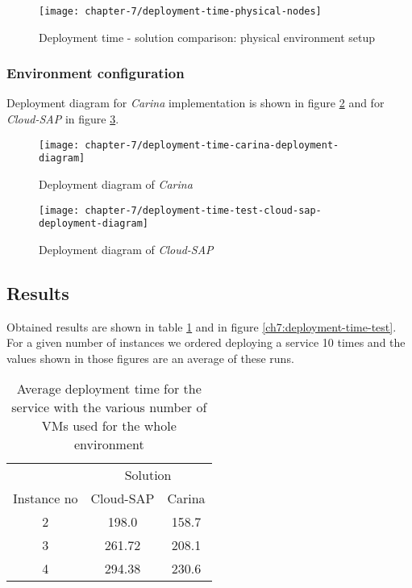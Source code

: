 \begin{figure}[!ht]
  \begin{center}
    \texttt{[image: chapter-7/deployment-time-physical-nodes]}
  \end{center}
  \caption{Deployment time - solution comparison: physical environment setup}
  \label{eval:deployment-time-physical-nodes}
\end{figure}

\subsubsection{Environment configuration}
Deployment diagram for \emph{Carina} implementation is shown in figure \ref{ch7:deployment-time-test-deployment-time-carina-deployment-diagram} and for \emph{Cloud-SAP} in figure \ref{ch7:deployment-time-test-cloud-sap-deployment-diagram}.

\begin{figure}[!ht]
  \begin{center}
    \texttt{[image: chapter-7/deployment-time-carina-deployment-diagram]}
  \end{center}
  \caption{Deployment diagram of \emph{Carina}}
  \label{ch7:deployment-time-test-deployment-time-carina-deployment-diagram}
\end{figure}

\begin{figure}[!ht]
  \begin{center}
    \texttt{[image: chapter-7/deployment-time-test-cloud-sap-deployment-diagram]}
  \end{center}
  \caption{Deployment diagram of \emph{Cloud-SAP}}
  \label{ch7:deployment-time-test-cloud-sap-deployment-diagram}
\end{figure}

\subsection*{Results}
Obtained results are shown in table \ref{tbl:test-service-deployment-time} and in figure \ref{ch7:deployment-time-test}. For a given number of instances we ordered deploying a service 10 times and the values shown in those figures are an average of these runs.

\begin{table}
  \centering
  \begin{tabular}{ c  c  c }
    \hline
    & \multicolumn{2}{c}{Solution} \\
    \cline{2-3}
    Instance no & Cloud-SAP & Carina \\
    \hline
    2 & 198.0 & 158.7 \\
    3 & 261.72 & 208.1 \\
    4 & 294.38 & 230.6 \\
    \hline
  \end{tabular}
  \caption{Average deployment time for the service with the various number of VMs used for the whole environment}
  \label{tbl:test-service-deployment-time}
\end{table}

